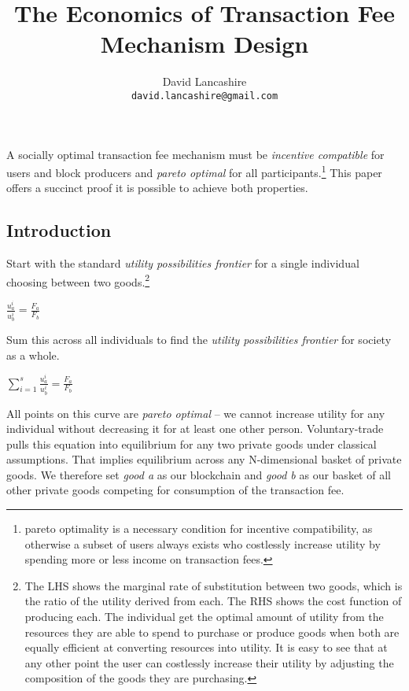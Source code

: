 \documentclass[oneside]{article}   	%
\title{The Economics of Transaction Fee Mechanism Design}
\author{
  David Lancashire\\
  \texttt{david.lancashire@gmail.com}\\
}
\begin{document}
\maketitle

\begin{onecolabstract}
A socially optimal transaction fee mechanism must be \textit{incentive compatible} for users and block producers and \textit{pareto optimal} for all participants.\footnote{pareto optimality is a necessary condition for incentive compatibility, as otherwise a subset of users always exists who costlessly increase utility by spending more or less income on transaction fees.} This paper offers a succinct proof it is possible to achieve both properties.
\end{onecolabstract}
\bigskip 

\subsection*{Introduction}

Start with the standard \textit{utility possibilities frontier} for a single individual choosing between two goods.\footnote{The LHS shows the marginal rate of substitution between two goods, which is the ratio of the utility derived from each. The RHS shows the cost function of producing each. The individual get the optimal amount of utility from the resources they are able to spend to purchase or produce goods when both are equally efficient at converting resources into utility. It is easy to see that at any other point the user can costlessly increase their utility by adjusting the composition of the goods they are purchasing.}

\LARGE
\begin{adjustwidth}{1.5em}{1.5em} 
\begin{math}
\frac{u_a^i}{u_b^i} = \frac{F_a}{F_b}
\end{math}
\end{adjustwidth}
\normalsize

Sum this across all individuals to find the \textit{utility possibilities frontier} for society as a whole.

\LARGE
\begin{adjustwidth}{1.5em}{1.5em} 
\begin{math}
\sum_{i=1}^{s} \frac{u_a^i}{u_b^i} = \frac{F_a}{F_b}
\end{math}
\end{adjustwidth}
\normalsize

All points on this curve are \textit{pareto optimal} -- we cannot increase utility for any individual without decreasing it for at least one other person. Voluntary-trade pulls this equation into equilibrium for any two private goods under classical assumptions. That implies equilibrium across any N-dimensional basket of private goods. We therefore set \textit{good a} as our blockchain and \textit{good b} as our basket of all other private goods competing for consumption of the transaction fee.
\end{document}

